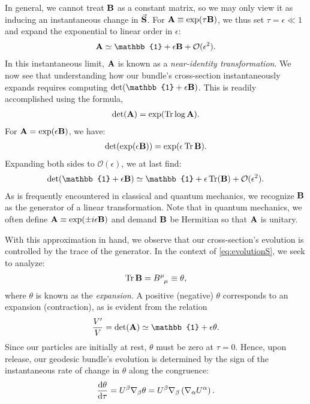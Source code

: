 \documentclass[10pt]{article}
\newcommand{\<}{\langle}
\renewcommand{\>}{\rangle}
\renewcommand{\(}{\left(}
\renewcommand{\)}{\right)}
\renewcommand{\[}{\left[}
\renewcommand{\]}{\right]}
\begin{document}
		In general, we cannot treat $\vb{B}$ as a constant matrix, so we may only view it as inducing an instantaneous change in $\va{S}$. For $\vb{A} \equiv \exp(\tau \vb{B})$, we thus set $\tau = \epsilon \ll 1$ and expand the exponential to linear order in $\epsilon$:
		\begin{align}
			\vb{A} \simeq \mathbb{1} + \epsilon\vb{B} + \mathcal{O}(\epsilon^2).
		\end{align}
		In this instantaneous limit, $\vb{A}$ is known as a \textit{near-identity transformation}. We now see that understanding how our bundle's cross-section instantaneously expands requires computing $\det(\mathbb{1}+\epsilon\vb{B})$. This is readily accomplished using the formula,
		\begin{align}
			\det(\vb{A}) = \exp(\Tr \log \vb{A}).
		\end{align}
		For $\vb{A}=\exp(\epsilon \vb{B})$, we have:
		\begin{align}
			\det(\exp(\epsilon \vb{B})) = \exp(\epsilon \Tr \vb{B}).
		\end{align}
		Expanding both sides to $\mathcal{O}(\epsilon)$, we at last find:
		\begin{align}\label{eq:detApprox}
			\det(\mathbb{1} + \epsilon\vb{B}) \simeq \mathbb{1} + \epsilon\Tr(\vb{B}) + \mathcal{O}(\epsilon^2).
		\end{align}
		As is frequently encountered in classical and quantum mechanics, we recognize $\vb{B}$ as the generator of a linear transformation. Note that in quantum mechanics, we often define $\vb{A} \equiv \exp(\pm i \epsilon \vb{B})$ and demand $\vb{B}$ be Hermitian so that $\vb{A}$ is unitary.
		
		With this approximation in hand, we observe that our cross-section's evolution is controlled by the trace of the generator. In the context of \eqref{eq:evolutionS}, we seek to analyze:
		\begin{align}
			\Tr \vb{B} = \tensor{B}{^\mu_\mu} \equiv \theta,
		\end{align}
		where $\theta$ is known as the \textit{expansion}. A positive (negative) $\theta$ corresponds to an expansion (contraction), as is evident from the relation
		\begin{align}\label{eq:evolutionVol}
			\frac{V'}{V} = \det(\vb{A}) \simeq \mathbb{1} + \epsilon\theta.
		\end{align}
		Since our particles are initially at rest, $\theta$ must be zero at $\tau=0$. Hence, upon release, our geodesic bundle's evolution is determined by the sign of the instantaneous rate of change in $\theta$ along the congruence:
		\begin{align}\label{eq:evolutionTheta}
			\dv{\theta}{\tau} = U^\beta \nabla_\beta \theta = U^\beta \nabla_\beta \( \nabla_\alpha U^\alpha \).
		\end{align}
		
\end{document}
